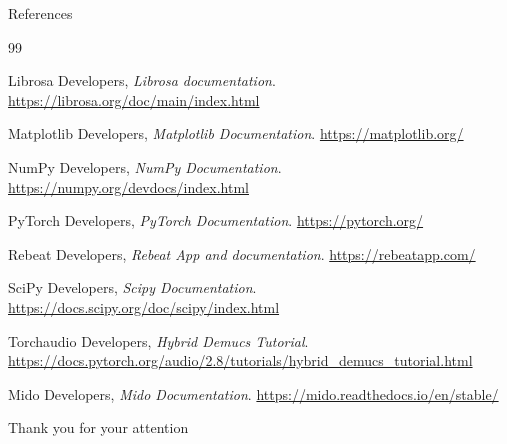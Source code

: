 \documentclass[aspectratio=169]{beamer}
\begin{document}
\begin{frame}{References}
\footnotesize
\begin{thebibliography}{99}

Librosa Developers, \emph{Librosa documentation}. \url{https://librosa.org/doc/main/index.html}

Matplotlib Developers, \emph{Matplotlib Documentation}. \url{https://matplotlib.org/}

NumPy Developers, \emph{NumPy Documentation}. \url{https://numpy.org/devdocs/index.html}

PyTorch Developers, \emph{PyTorch Documentation}. \url{https://pytorch.org/}

Rebeat Developers, \emph{Rebeat App and documentation}. \url{https://rebeatapp.com/}

SciPy Developers, \emph{Scipy Documentation}. \url{https://docs.scipy.org/doc/scipy/index.html}

Torchaudio Developers, \emph{Hybrid Demucs Tutorial}. \url{https://docs.pytorch.org/audio/2.8/tutorials/hybrid_demucs_tutorial.html}

Mido Developers, \emph{Mido Documentation}. \url{https://mido.readthedocs.io/en/stable/}

\end{thebibliography}
\end{frame}

\begin{frame}
    \centering
    \Huge Thank you for your attention
\end{frame}
\end{document}
